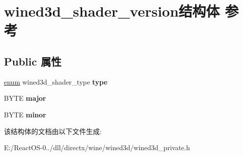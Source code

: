 \hypertarget{structwined3d__shader__version}{}\section{wined3d\+\_\+shader\+\_\+version结构体 参考}
\label{structwined3d__shader__version}
\subsection*{Public 属性}
\begin{DoxyCompactItemize}
\item 
\mbox{\label{structwined3d__shader__version_a70b1b50b46ea8b2090cfaca7a59d1507}} 
\hyperlink{interfaceenum}{enum} wined3d\+\_\+shader\+\_\+type {\bfseries type}
\item 
\mbox{\label{structwined3d__shader__version_a762b9ff019865ba6f407466d8e3d7891}} 
B\+Y\+TE {\bfseries major}
\item 
\mbox{\label{structwined3d__shader__version_ae9ebf8ebca51390c492270724abbbd5e}} 
B\+Y\+TE {\bfseries minor}
\end{DoxyCompactItemize}


该结构体的文档由以下文件生成\+:\begin{DoxyCompactItemize}
\item 
E\+:/\+React\+O\+S-\/0../dll/directx/wine/wined3d/wined3d\+\_\+private.\+h\end{DoxyCompactItemize}
